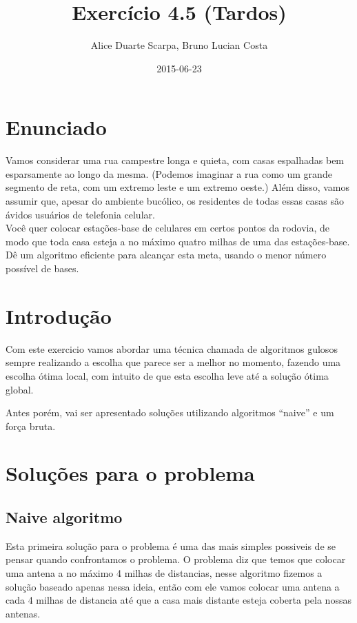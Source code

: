 \documentclass[11pt]{article}
\author{Alice Duarte Scarpa, Bruno Lucian Costa}
\date{2015-06-23}
\title{Exercício 4.5 (Tardos)}
\begin{document}
\maketitle

\section{Enunciado}
\label{sec-1}

Vamos considerar uma rua campestre longa e quieta, 
com casas espalhadas bem esparsamente ao longo da mesma. 
(Podemos imaginar a rua como um grande segmento de reta, 
com um extremo leste e um extremo oeste.) 
Além disso, vamos assumir que, apesar do ambiente bucólico, 
os residentes de todas essas casas são ávidos usuários de telefonia celular.
\\

\noindent
Você quer colocar estações-base de celulares em certos pontos da rodovia, 
de modo que toda casa esteja a no máximo quatro milhas de uma das estações-base. 
Dê um algoritmo eficiente para alcançar esta meta, usando o menor número possível de bases.



\section{Introdução}
\label{sec-2}

Com este exercicio vamos abordar uma técnica chamada de algoritmos gulosos
sempre realizando a escolha que parece ser a melhor no momento, fazendo uma escolha ótima local, 
com intuito de que esta escolha leve até a solução ótima global.

Antes porém, vai ser apresentado soluções utilizando algoritmos ``naive'' e um força bruta. 


\section{Soluções para o problema}
\label{sec-3}


\subsection{Naive algoritmo}
\label{sec-3-1}

Esta primeira solução para o problema é uma das mais simples possiveis de se pensar quando confrontamos o problema.
O problema diz que temos que colocar uma antena a no máximo 4 milhas de distancias, nesse algoritmo fizemos a solução 
baseado apenas nessa ideia, então com ele vamos colocar uma antena a cada 4 milhas de distancia até que a casa mais distante 
esteja coberta pela nossas antenas.
\end{document}
